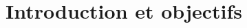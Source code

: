 \def\xxactivite{Tris}

\def\xxauteur{Emilien Durif -- Xavier Pessoles}
\fichefalse \proftrue \tdfalse \courstrue

\def\xxnumchapitre{Chapitre 8 \vspace{.2cm}}

\def\xxchapitre{Tris}

\def\xxcompetences{%
\textsl{%
\textbf{Savoirs et compétences :}\\
\begin{itemize}[label=\ding{112},font=\color{bleuxp}] 
\item Tris.
\end{itemize}
}}

\def\xxfigures{
}%



\setlength{\columnseprule}{.1pt}

\vspace{2cm}
\pagestyle{fancy}
\thispagestyle{plain}

% 
%



\section{Introduction et objectifs}

